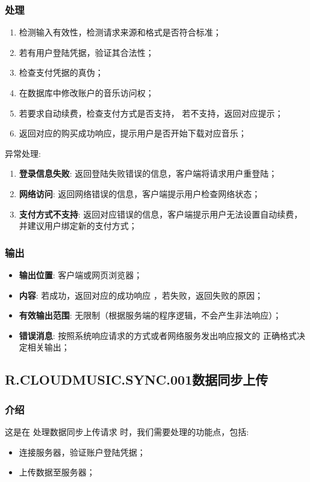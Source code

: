 {\subsubsection{处理}
	\begin{enumerate}
		\item 检测输入有效性，检测请求来源和格式是否符合标准；
		\item 若有用户登陆凭据，验证其合法性；
		\item 检查支付凭据的真伪；
		\item 在数据库中修改账户的音乐访问权；
		\item 若要求自动续费，检查支付方式是否支持，
			若不支持，返回对应提示；
		\item 返回对应的购买成功响应，提示用户是否开始下载对应音乐；
	\end{enumerate}
	\noindent 异常处理: 
	\begin{enumerate}
		\item \textbf{登录信息失败}: 返回登陆失败错误的信息，客户端将请求用户重登陆；
		\item \textbf{网络访问}: 返回网络错误的信息，客户端提示用户检查网络状态；
		\item \textbf{支付方式不支持}: 返回对应错误的信息，客户端提示用户无法设置自动续费，
			并建议用户绑定新的支付方式；
	\end{enumerate}
\subsubsection{输出}
\begin{itemize}
	\item \textbf{输出位置}: 客户端或网页浏览器；
	\item \textbf{内容}: 若成功，返回对应的成功响应 ，若失败，返回失败的原因；
	\item \textbf{有效输出范围}: 无限制（根据服务端的程序逻辑，不会产生非法响应）；
	\item \textbf{错误消息}: 按照系统响应请求的方式或者网络服务发出响应报文的
		正确格式决定相关输出；
\end{itemize}
}
\fi
\subsection{R.CLOUDMUSIC.SYNC.001数据同步上传}
\subsubsection{介绍}
	这是在 处理数据同步上传请求 时，我们需要处理的功能点，包括: 
	\begin{itemize}
		\item 连接服务器，验证账户登陆凭据；
		\item 上传数据至服务器；
	\end{itemize}
